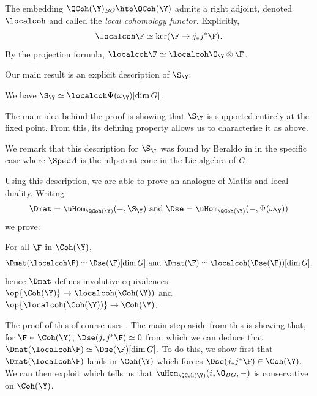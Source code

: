 \documentclass{amsart}
\begin{document}
  The embedding \(\QCoh(\Y)_{BG} \hto \QCoh(\Y)\)
  admits a right adjoint, denoted \(\localcoh\)
  and called the \emph{local cohomology functor}.
  Explicitly,
  \begin{displaymath}
    \localcoh \F \simeq \ker(\F \to j_\ast j^\ast \F).
  \end{displaymath}
  By the projection formula, \(\localcoh \F \simeq \localcoh \O_\Y \otimes \F\).

  \sssec{}

  Our main result is an explicit description of \(\S_\Y\):

  \begin{mainthm}\label{thm:serre_functor}
    We have \(\S_\Y \simeq \localcoh \Psi(\omega_\Y)[\dim G]\).
  \end{mainthm}

  The main idea behind the proof is showing that \(\S_\Y\)
  is supported entirely at the fixed point. From this,
  its defining property allows us to characterise it
  as above.

  We remark that this description for \(\S_\Y\) was
  found by Beraldo in \cite{beraldo:2021} in the
  specific case where \(\Spec A\) is the
  nilpotent cone in the Lie algebra of \(G\).

  \sssec{}

  Using this description, we are able to prove an analogue
  of Matlis and local duality. Writing
  \begin{displaymath}
    \Dmat = \uHom_{\QCoh(\Y)}(-, \S_\Y) \text{ and } \Dse = \uHom_{\QCoh(\Y)}(-, \Psi(\omega_\Y))
  \end{displaymath}
  we prove:

  \begin{mainthm}\label{thm:matlis_local_duality}
    For all \(\F\) in \(\Coh(\Y)\),
    \begin{displaymath}
      \Dmat(\localcoh \F) \simeq \Dse(\F)[\dim G] \text{ and } \Dmat(\F) \simeq \localcoh(\Dse(\F)) [\dim G],
    \end{displaymath}
    hence \(\Dmat\) defines involutive equivalences 
    \(\op{\Coh(\Y)} \to \localcoh(\Coh(\Y))\) and \(\op{\localcoh(\Coh(\Y))} \to \Coh(\Y)\).
  \end{mainthm}

  The proof of this of course uses .
  The main step aside from this is showing that, for
  \(\F \in \Coh(\Y)\), \(\Dse(j_\ast j^\ast \F) \simeq 0\)
  from which we can deduce that \(\Dmat(\localcoh \F) \simeq \Dse(\F)[\dim G]\).
  To do this, we show first that \(\Dmat(\localcoh \F)\)
  lands in \(\Coh(\Y)\) which forces \(\Dse(j_\ast j^\ast \F) \in \Coh(\Y)\).
  We can then exploit 
  which tells us that \(\uHom_{\QCoh(\Y)}(i_\ast \O_{BG}, -)\)
  is conservative on \(\Coh(\Y)\).
\end{document}
